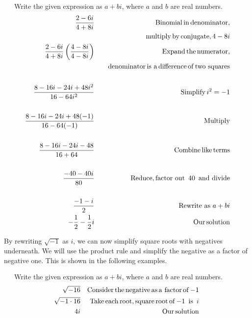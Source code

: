 \begin{example}~~~Write the given expression as $a+bi$, where $a$ and $b$ are real numbers.
  \begin{eqnarray*}
    \frac{2 - 6 i}{4 + 8 i} &  & \tmop{Binomial} \tmop{in} \tmop{denominator},\\
    & & ~~~\tmop{multiply} \tmop{by} \tmop{conjugate}, 4 - 8 i\\
    \frac{2 - 6 i}{4 + 8 i} \left( \frac{4 - 8 i}{4 - 8 i} \right) &  &
    \tmop{Expand} \tmop{the} \tmop{numerator},\\
		&&~~~\tmop{denominator} \tmop{is~a}
    \tmop{difference} \tmop{of} \tmop{two~squares}\\
    &  & \\
    \frac{8 - 16 i - 24 i + 48 i^2}{16 - 64 i^2} &  & \tmop{Simplify} i^2 = -
    1\\
    &  & \\
    \frac{8 - 16 i - 24 i + 48 (- 1)}{16 - 64 (- 1)} &  & \tmop{Multiply}\\
    &  & \\
    \frac{8 - 16 i - 24 i - 48}{16 + 64} &  & \tmop{Combine} \tmop{like}
    \tmop{terms}\\%
    &  & \\
    \frac{- 40 - 40 i}{80} &  & \tmop{Reduce}, \tmop{factor~out~}40 \tmop{~and~divide}\\
    &  & \\
    \frac{- 1 - i}{2}& &\text{Rewrite as~} a+bi\\
		-\frac{1}{2} - \frac{1}{2}i &  & \tmop{Our} \tmop{solution}
  \end{eqnarray*}
\end{example}

\newpage

By rewriting $\sqrt{-1}$ as $i$, we can now simplify square roots with negatives underneath. We will use
the product rule and simplify the negative as a factor of negative one. This
is shown in the following examples.

\begin{example}~~~Write the given expression as $a+bi$, where $a$ and $b$ are real numbers.
  \begin{eqnarray*}
    \sqrt{- 16} &  & \operatorname{Consider} \operatorname{the} \operatorname{negative} \operatorname{as} 
    \operatorname{a~factor} \operatorname{of} - 1\\
    \sqrt[]{- 1 \cdot 16} &  & \operatorname{Take} \operatorname{each} \operatorname{root},
    \operatorname{square} \operatorname{root} \operatorname{of} - 1 \operatorname{~is~} i\\
    4 i &  & \operatorname{Our} \operatorname{solution}
  \end{eqnarray*}
\end{example}

